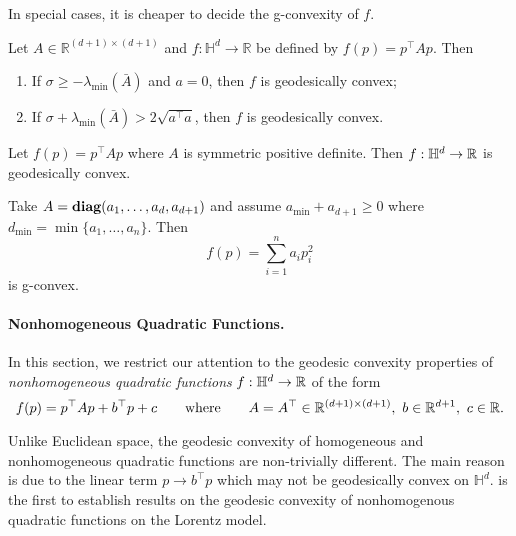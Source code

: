\documentclass[twoside,11pt]{article}
\begin{document}
In special cases, it is cheaper to decide the g-convexity of $f$.

\begin{theorem}
Let $A \in \mathbb{R}^{(d+1) \times(d+1)}$ and $f: \mathbb{H}^d \rightarrow \mathbb{R}$ be defined by $f(p)=p^{\top} A p$. Then

\begin{enumerate}
\item  If $\sigma \geq-\lambda_{\min }(\bar{A})$ and $a=0$, then $f$ is geodesically convex;
\item  If $\sigma+\lambda_{\min }(\bar{A})>2 \sqrt{a^{\top} a}$, then $f$ is geodesically convex.
\end{enumerate}

\end{theorem}



\begin{example}
    Let $f(p) = p^\top A p$ where $A$ is symmetric positive definite. Then $f:\mathbb{H}^d \to \mathbb{R}$ is geodesically convex.
\end{example}\label{ex:spd_hyperbolic}

\begin{example}
    Take $A = \textbf{diag}(a_1, \ldots, a_d, a_{d+1})$ and assume $a_{\min} + a_{d+1} \geq 0$ where $d_{\min} = \min\{a_1, \ldots, a_n\}$. Then 
    \[
    f(p) = \sum_{i=1}^n a_i p_i^2
    \]
    is g-convex. 
\end{example}


\paragraph{Nonhomogeneous Quadratic Functions.}
In this section, we restrict our attention to the geodesic convexity properties of \emph{nonhomogeneous quadratic functions} $f:\mathbb{H}^d \to \mathbb{R}$ of the form  
\[
f(p) = p^\top A p + b^\top p + c \qquad  \text{where} \qquad A = A^\top  \in \real^{(d+1)\times(d+1)}, \ b \in \real^{d+1}, \ c \in \real.
\]


Unlike Euclidean space, the geodesic convexity of homogeneous and nonhomogeneous quadratic functions are non-trivially different. The main reason is due to the linear term $p \to b^\top p$ which may not be geodesically convex on $\mathbb{H}^d$. \citep{Ferreira2023_nonhomogeneous} is the first to establish results on the geodesic convexity of  nonhomogenous quadratic functions on the Lorentz model.
\end{document}
